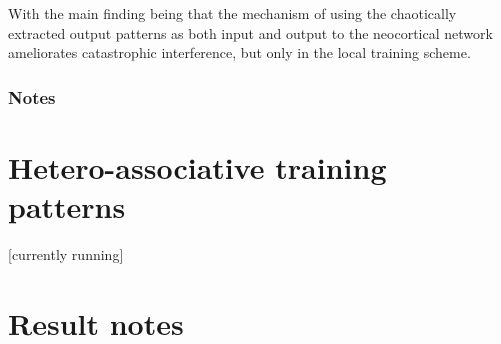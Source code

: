 With the main finding being that the mechanism of using the chaotically extracted output patterns as both input and output to the neocortical network ameliorates catastrophic interference, but only in the local training scheme. 


\subsubsection{Notes}


\section{Hetero-associative training patterns}\label{sect:hetero-associative}

[currently running]




\section*{Result notes}

